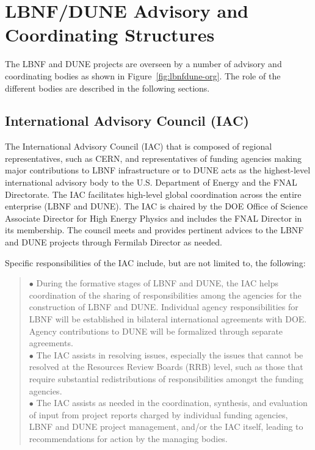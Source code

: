 \section{LBNF/DUNE Advisory and Coordinating Structures}
\label{sec:lbnf-dune-interface}


The LBNF and DUNE projects are overseen by a number of advisory and
coordinating bodies as shown in Figure~\ref{fig:lbnfdune-org}.
The role of the different bodies are described in the following sections.  

\subsection{International Advisory Council (IAC) }

The International Advisory Council (IAC) that is composed of
regional representatives, such as CERN, and representatives of
funding agencies making major contributions to LBNF infrastructure or to DUNE
acts as the highest-level international advisory body to the U.S.
Department of Energy and the FNAL Directorate. The IAC facilitates
high-level global coordination across the entire enterprise (LBNF and DUNE).
The IAC is chaired by the DOE Office of Science Associate Director
for High Energy Physics and includes the FNAL Director in its membership.  
The council meets and provides pertinent advices to the LBNF and DUNE
projects through Fermilab Director as needed.  

Specific responsibilities of the IAC include, but are not limited to,
the following:


\begin{quote}
$\bullet$ During the formative stages of LBNF and DUNE,
the IAC helps coordination of the sharing of responsibilities among
the agencies for the construction of LBNF and DUNE.
Individual agency responsibilities for LBNF will be established in
bilateral international agreements with DOE. Agency contributions to
DUNE will be formalized through separate agreements.\\
$\bullet$ The IAC assists in resolving issues, especially the
issues that cannot be resolved at the Resources Review Boards (RRB) level,
such as those that require substantial redistributions of
responsibilities amongst the funding agencies.\\
$\bullet$ The IAC assists as needed in the coordination,
synthesis, and evaluation of input from project reports charged by
individual funding agencies, LBNF and DUNE project management,
and/or the IAC itself, leading to recommendations for action by
the managing bodies.
\end{quote}

